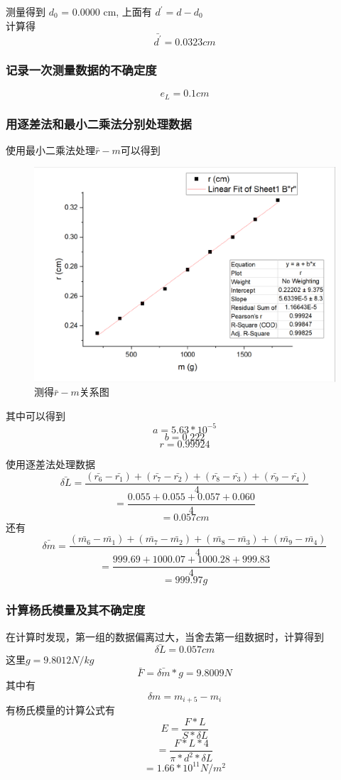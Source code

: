 \documentclass[a4paper,11pt]{article}
\begin{document}
测量得到 $d_0$ = 0.0000 cm,
上面有 $ d^{\prime} = d - d_0 $\\
计算得$$ \bar{d^{\prime}} = 0.0323 cm $$

\subsubsection{记录一次测量数据的不确定度}
$$ e_{L} = 0.1 cm $$

\subsubsection{用逐差法和最小二乘法分别处理数据}
使用最小二乘法处理$ \bar{r} - m $可以得到
\begin{figure}[H]
	\centering
	\includegraphics[width=.8\linewidth]{图片1.png}
	\caption{ 测得$ \bar{r} - m $关系图}
\end{figure}\noindent%
其中可以得到$$ a = 5.63 * 10^{-5} $$
$$ b = 0.222 $$
$$ r = 0.99924 $$

使用逐差法处理数据$$  \bar{\delta L} = \dfrac{(\bar{r_6} - \bar{r_1})+(\bar{r_7} - \bar{r_2})+(\bar{r_8} - \bar{r_3})+(\bar{r_9} - \bar{r_4})}{4} $$
$$ = \dfrac{0.055 + 0.055 + 0.057 + 0.060}{4} $$
$$ = 0.057 cm $$
还有$$  \bar{\delta m} = \dfrac{(\bar{m_6} - \bar{m_1})+(\bar{m_7} - \bar{m_2})+(\bar{m_8} - \bar{m_3})+(\bar{m_9} - \bar{m_4})}{4} $$
$$ = \dfrac{999.69 + 1000.07 + 1000.28 + 999.83}{4} $$
$$ = 999.97 g $$
\subsubsection{计算杨氏模量及其不确定度}
在计算时发现，第一组的数据偏离过大，当舍去第一组数据时，计算得到
$$ \bar{\delta L} = 0.057 cm $$
这里$g = 9.8012 N/kg$
$$ \bar{F} = \bar{\delta m} * g  = 9.8009 N  $$
其中有$$ \delta m = m_{i+5} - m_{i} $$
有杨氏模量的计算公式有
$$ E = \dfrac{F * L}{S * \delta L } $$
$$  = \dfrac{F * L * 4}{\pi * d^2 * \delta L } $$
$$ = 1.66 * 10 ^{11} N/m^2 $$
\end{document}
